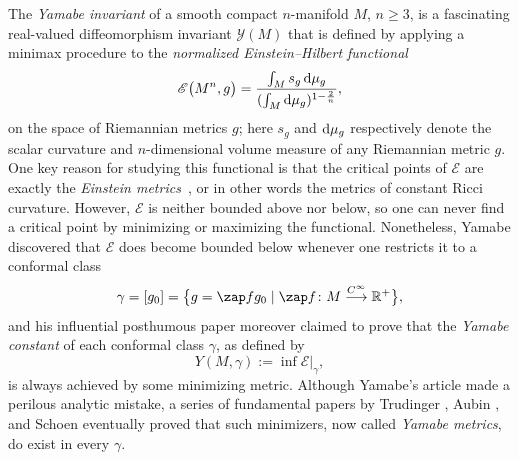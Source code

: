 \documentclass[pdftex]{sigma}
\numberwithin{equation}{section}
\def\RR{\mathbb{R}}
\begin{document}
The {\em Yamabe invariant} of a smooth compact $n$-manifold $M$, $n\geq 3$, is a
fascinating real-valued diffeomorphism invariant $\mathscr{Y}(M)$ that is defined by applying a minimax procedure to the
{\em normalized Einstein--Hilbert functional}
\begin{equation*}%
\mathscr{E} \big(M^n, g \big) = \frac{\int_M s_g \,{\rm d}\mu_g}{(\int_M {\rm d}\mu_g)^{1-\frac{2}{n}}},
\end{equation*}
on the space of Riemannian metrics $g$; here $s_g$ and ${\rm d}\mu_g$ respectively denote the scalar curvature and
$n$-dimensional volume measure of any Riemannian metric $g$. One key reason
for studying this functional is that the critical points of $\mathscr{E}$ are exactly the {\em Einstein metrics}~\cite{bes},
or in other words the metrics of constant Ricci curvature. However, $\mathscr{E}$ is neither bounded above nor below,
so one can never find a critical point by minimizing or maximizing the functional. Nonetheless, Yamabe discovered that
$\mathscr{E}$ {does} become bounded below whenever one restricts it to a conformal class
\begin{equation*}
\gamma = [g_0]= \big\{ g = {\zap f} g_0 \mid {\zap f}\colon M\stackrel{C^\infty}{\longrightarrow} \RR^+\big\},
\end{equation*}
and his influential posthumous paper \cite{yamabe} moreover claimed to prove
 that the {\em Yamabe constant} of each conformal class $\gamma$, as defined by
 \begin{equation*}
Y(M, \gamma ) := \inf \mathscr{E} |_\gamma ,
\end{equation*}
 is always achieved by some minimizing metric.
 Although Yamabe's article made a perilous analytic mistake, a series of fundamental papers by
Trudinger \cite{trud}, Aubin \cite{aubyam}, and Schoen \cite{rick} eventually proved that such
minimizers, now called {\em Yamabe metrics}, do exist in every $\gamma$.
\end{document}

